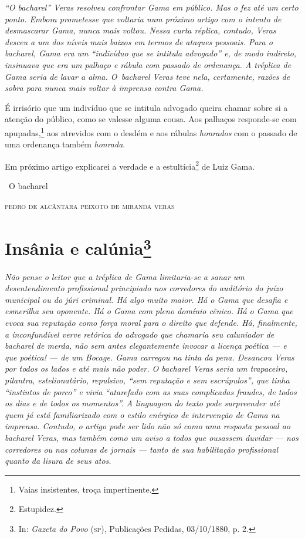 {\begin{resumo}
\emph{``O bacharel'' Veras resolveu confrontar Gama em público. Mas o fez
até um certo ponto. Embora prometesse que voltaria num próximo artigo
com o intento de desmascarar Gama, nunca mais voltou. Nessa curta
réplica, contudo, Veras desceu a um dos níveis mais baixos em termos de
ataques pessoais. Para o bacharel, Gama era um ``indivíduo que se
intitula advogado'' e, de modo indireto, insinuava que era um palhaço e
rábula com passado de ordenança. A tréplica de Gama seria de lavar a
alma. O~bacharel Veras teve nela, certamente, razões de sobra para nunca
mais voltar à imprensa contra Gama. }
\end{resumo}

É irrisório que um indivíduo que se intitula advogado queira chamar
sobre si a atenção do público, como se valesse alguma cousa. Aos
palhaços responde-se com apupadas,\footnote{Vaias insistentes, troça
  impertinente.} aos atrevidos com o desdém e aos rábulas
\emph{honrados} com o passado de uma ordenança também \emph{honrada}.

Em próximo artigo explicarei a verdade e a estultícia\footnote{
  Estupidez.} de Luiz Gama.\medskip

\hfill\ O bacharel

\hfill\textsc{pedro de alcântara peixoto de miranda veras}

\chapter{Insânia e calúnia\footnote{In: \emph{Gazeta do Povo}
  (\textsc{sp}), Publicações Pedidas, 03/10/1880, p. 2.}}


\begin{resumo}
\emph{Não pense o leitor que a tréplica de Gama limitaria-se a sanar um
desentendimento profissional principiado nos corredores do auditório do
juízo municipal ou do júri criminal. Há algo muito maior. Há o Gama
que desafia e esmerilha seu oponente. Há o Gama com pleno domínio
cênico. Há o Gama que evoca sua reputação como força moral para o
direito que defende. Há, finalmente, a inconfundível verve retórica do
advogado que chamaria seu caluniador de bacharel de merda, não sem antes
elegantemente invocar a licença poética --- e que poética! --- de um
Bocage. Gama carregou na tinta da pena. Desancou Veras por todos os
lados e até mais não poder. O bacharel Veras seria um trapaceiro,
pilantra, estelionatário, repulsivo, ``sem reputação e sem escrúpulos'',
que tinha ``instintos de porco'' e vivia ``atarefado com as suas
complicadas fraudes, de todos os dias e de todos os momentos''. A
linguagem do texto pode surpreender até quem já está familiarizado com o
estilo enérgico de intervenção de Gama na imprensa. Contudo, o artigo
pode ser lido não só como uma resposta pessoal ao bacharel Veras, mas
também como um aviso a todos que ousassem duvidar --- nos corredores ou
nas colunas de jornais --- tanto de sua habilitação profissional quanto
da lisura de seus atos.}
\end{resumo}

}
